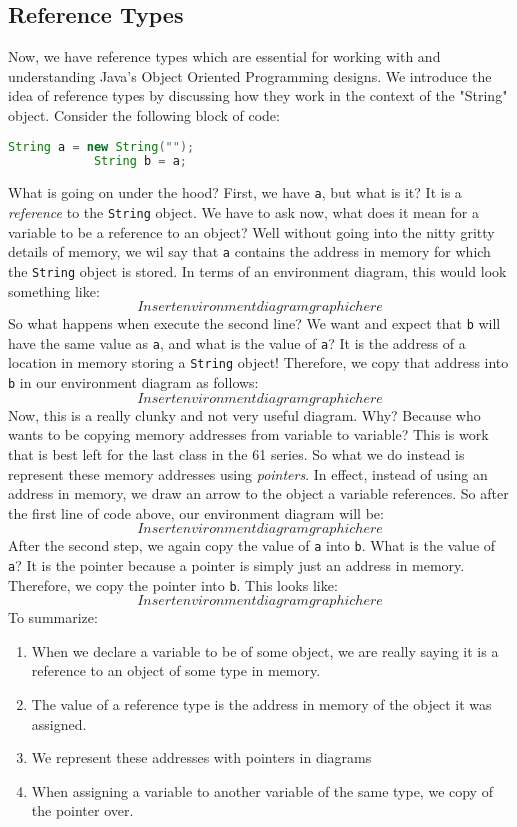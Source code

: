\documentclass{article}
\begin{document}
    \subsection{Reference Types}
    Now, we have reference types which are essential for working with and understanding Java's Object Oriented Programming designs. We introduce the idea of reference types by discussing how they work in the context of the "String" object. Consider the following block of code:
        \begin{lstlisting}[language=Java]
            String a = new String("");
            String b = a;
        \end{lstlisting}
    What is going on under the hood? First, we have \texttt{a}, but what is it? It is a \textit{reference} to the \texttt{String} object. We have to ask now, what does it mean for a variable to be a reference to an object? Well without going into the nitty gritty details of memory, we wil say that \texttt{a} contains the address in memory for which the \texttt{String} object is stored. In terms of an environment diagram, this would look something like:
        $$Insert environment diagram graphic here$$
    So what happens when execute the second line? We want and expect that \texttt{b} will have the same value as \texttt{a}, and what is the value of \texttt{a}? It is the address of a location in memory storing a \texttt{String} object! Therefore, we copy that address into \texttt{b} in our environment diagram as follows:
        $$Insert environment diagram graphic here$$
    Now, this is a really clunky and not very useful diagram. Why? Because who wants to be copying memory addresses from variable to variable? This is work that is best left for the last class in the 61 series. So what we do instead is represent these memory addresses using \textit{pointers}. In effect, instead of using an address in memory, we draw an arrow to the object a variable references. So after the first line of code above, our environment diagram will be:
        $$Insert environment diagram graphic here$$
    After the second step, we again copy the value of \texttt{a} into \texttt{b}. What is the value of \texttt{a}? It is the pointer because a pointer is simply just an address in memory. Therefore, we copy the pointer into \texttt{b}. This looks like:
        $$Insert environment diagram graphic here$$
    To summarize:
        \begin{multicols}{2}
            \begin{enumerate}
                \item When we declare a variable to be of some object, we are really saying it is a reference to an object of some type in memory.
                \item The value of a reference type is the address in memory of the object it was assigned.
                \item We represent these addresses with pointers in diagrams
                \item When assigning a variable to another variable of the same type, we copy of the pointer over.
            \end{enumerate}
        \end{multicols}
\end{document}
